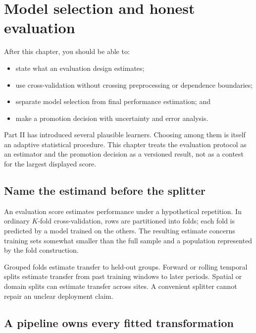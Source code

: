 \chapter{Model selection and honest evaluation}
\label{ch:model-selection}

\begin{learningobjectives}
After this chapter, you should be able to:
\begin{itemize}
  \item state what an evaluation design estimates;
  \item use cross-validation without crossing preprocessing or dependence boundaries;
  \item separate model selection from final performance estimation; and
  \item make a promotion decision with uncertainty and error analysis.
\end{itemize}
\end{learningobjectives}

\begin{chapterconnection}
Part II has introduced several plausible learners. Choosing among them is itself
an adaptive statistical procedure. This chapter treats the evaluation protocol
as an estimator and the promotion decision as a versioned result, not as a
contest for the largest displayed score.
\end{chapterconnection}

\section{Name the estimand before the splitter}

An evaluation score estimates performance under a hypothetical repetition. In
ordinary $K$-fold cross-validation, rows are partitioned into folds; each fold
is predicted by a model trained on the others. The resulting estimate concerns
training sets somewhat smaller than the full sample and a population represented
by the fold construction.

Grouped folds estimate transfer to held-out groups. Forward or rolling temporal
splits estimate transfer from past training windows to later periods. Spatial or
domain splits can estimate transfer across sites. A convenient splitter cannot
repair an unclear deployment claim.

\section{A pipeline owns every fitted transformation}

